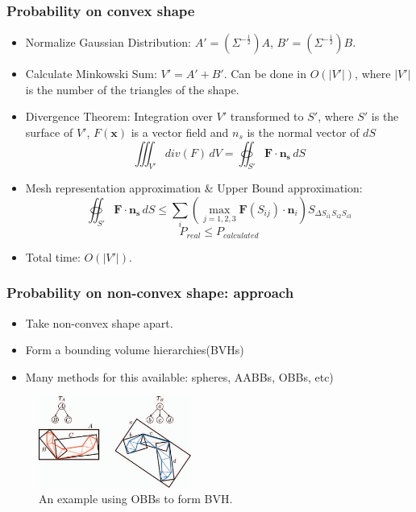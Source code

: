 \documentclass{beamer}
\begin{document}
\begin{frame}
	\frametitle{Probability on convex shape}
	\begin{itemize}
		\item Normalize Gaussian Distribution: $A' = (\Sigma^{-\frac{1}{2}})A$, $B' = (\Sigma^{-\frac{1}{2}})B$.
		\item Calculate Minkowski Sum: $V' = A' + B'$. Can be done in $O(|V'|)$, where $|V'|$ is the number of the triangles of the shape.
		\item Divergence Theorem: Integration over $V'$ transformed to $S'$, where $S'$ is the surface of $V'$, $F(\mathbf{x})$ is a vector field and $n_s$ is the normal vector of $dS$
		      $$\iiint_{V'}div(F)\,dV = \oiint_{S'}\mathbf{F}\cdot\mathbf{n_s}\,dS$$
		\item Mesh representation approximation \& Upper Bound approximation:
		      $$\oiint_{S'}\mathbf{F}\cdot\mathbf{n_s}\,dS \leq \sum_i(\max_{j = 1,2,3}\mathbf{F}(S_{ij})\cdot\mathbf{n}_i)S_{\Delta S_{i1}S_{i2}S_{i3}}$$
		      $$P_{real} \leq P_{calculated}$$
		\item Total time: $O(|V'|)$.
	\end{itemize}
\end{frame}

\begin{frame}
	\frametitle{Probability on non-convex shape: approach}
	\begin{itemize}
		\item Take non-convex shape apart.
		\item Form a bounding volume hierarchies(BVHs)
		\item Many methods for this available: spheres, AABBs, OBBs, etc)
	\end{itemize}
	\begin{figure}
		\includegraphics[width=5cm]{imgs/a.png}
		\caption{An example using OBBs to form BVH.}
	\end{figure}
\end{frame}
\end{document}
